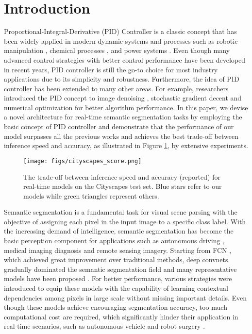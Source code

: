 \documentclass[10pt,twocolumn,letterpaper]{article}
\begin{document}
\section{Introduction}
\label{sec:intro}
Proportional-Integral-Derivative (PID) Controller is a classic concept that has been widely applied in modern dynamic systems and processes such as robotic manipulation \cite{pid_robot}, chemical processes \cite{pid_chemical}, and power systems \cite{pid_power}. Even though many advanced control strategies with better control performance have been developed in recent years, PID controller is still the go-to choice for most industry applications due to its simplicity and robustness. Furthermore, the idea of PID controller has been extended to many other areas. For example, researchers introduced the PID concept to image denoising \cite{pid_image}, stochastic gradient decent \cite{pid_stochastic} and numerical optimization \cite{pid_pso} for better algorithm performance. In this paper, we devise a novel architecture for real-time semantic segmentation tasks by employing the basic concept of PID controller and demonstrate that the performance of our model surpasses all the previous works and achieves the best trade-off between inference speed and accuracy, as illustrated in Figure \ref{fig:score}, by extensive experiments.

\begin{figure}
\centering
    \texttt{[image: figs/cityscapes\_score.png]}
\caption{The trade-off between inference speed and accuracy (reported) for real-time models on the Cityscapes \cite{cityscapes} test set. Blue stars refer to our models while green triangles represent others.}
\label{fig:score}
\end{figure}

Semantic segmentation is a fundamental task for visual scene parsing with the objective of assigning each pixel in the input image to a specific class label. 
With the increasing demand of intelligence, semantic segmentation has become the basic perception component for applications such as autonomous driving \cite{ss_auto}, medical imaging diagnosis \cite{ss_medical} and remote sensing imagery\cite{ss_remote}. 
Starting from FCN \cite{fcn}, which achieved great improvement over traditional methods, deep convnets gradually dominated the semantic segmentation field and many representative models have been proposed \cite{unet, segnet, deeplab, pspnet,hrnet,transformer}. 
For better performance, various strategies were introduced to equip these models with the capability of learning contextual dependencies among pixels in large scale without missing important details. 
Even though these models achieve encouraging segmentation accuracy, too much computational cost are required, which significantly hinder their application in real-time scenarios, such as autonomous vehicle \cite{ss_auto} and robot surgery \cite{surgery}.
\end{document}
